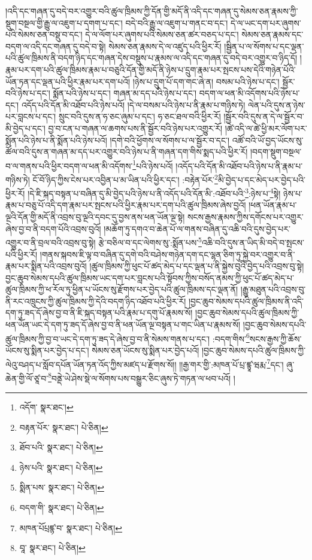 །འདི་དང་གཞན་དུ་བདེ་བར་འགྱུར་བའི་ཚུལ་ཁྲིམས་ཀྱི་དོན་གྱི་མདོ་ནི་འདི་དང་གཞན་དུ་སེམས་ཅན་རྣམས་ཀྱི་སྡུག་བསྔལ་གྱི་རྒྱུ་ལ་འཇུག་པ་དགག་པ་དང་། བདེ་བའི་རྒྱུ་ལ་འཇུག་པ་གནང་བ་དང་། དེ་ལ་ཡང་དག་པར་ཞུགས་པའི་སེམས་ཅན་བསྡུ་བ་དང་། དེ་ལ་ལོག་པར་ཞུགས་པའི་སེམས་ཅན་ཚར་བཅད་པ་དང་། སེམས་ཅན་རྣམས་དང་བདག་ལ་འདི་དང་གཞན་དུ་བདེ་བ་སྟེ། སེམས་ཅན་རྣམས་དེ་ལ་འཛུད་པའི་ཕྱིར་རོ། །སྦྱིན་པ་ལ་སོགས་པ་དང་ལྡན་པའི་ཚུལ་ཁྲིམས་ནི་བདག་ཉིད་དང་གཞན་དེས་བསྡུས་པ་རྣམས་ལ་འདི་དང་གཞན་དུ་བདེ་བར་འགྱུར་བ་ཉིད་དོ། །རྣམ་པར་དག་པའི་ཚུལ་ཁྲིམས་རྣམ་པ་བཅུའི་དོན་གྱི་མདོ་ནི་ཉེས་པ་དྲུག་རྣམ་པར་སྤངས་པས་དེའི་གཉེན་པོའི་ཡོན་ཏན་དང་ལྡན་པའི་ཕྱིར་རྣམ་པར་དག་པའོ། །ཉེས་པ་དྲུག་པོ་དག་གང་ཞེ་ན། བསམ་པའི་ཉེས་པ་དང་། སྦྱོར་བའི་ཉེས་པ་དང་། སྨོན་པའི་ཉེས་པ་དང་། གཞན་མ་དད་པའི་ཉེས་པ་དང་། བདག་ལ་ཕན་མི་འདོགས་པའི་ཉེས་པ་དང་། འདོད་པའི་དོན་མི་འཐོབ་པའི་ཉེས་པའོ། །དེ་ལ་བསམ་པའི་ཉེས་པ་ནི་རྣམ་པ་གཉིས་ཏེ། ལེན་པའི་དུས་ན་ཉེས་པར་བླངས་པ་དང་། སྲུང་བའི་དུས་ན་ཧ་ཅང་ཞུམ་པ་དང་། ཧ་ཅང་ཐལ་བའི་ཕྱིར་རོ། །སྦྱོར་བའི་དུས་ན་དེ་ལ་སྦྱོར་བ་མི་བྱེད་པ་དང་། བྱ་བ་ངན་པ་གཞན་ལ་ཆགས་པས་ནི་སྦྱོར་བའི་ཉེས་པར་འགྱུར་རོ། །ཚེ་འདི་ལ་ཚེ་ཕྱི་མར་ལོག་པར་སྨོན་པའི་ཉེས་པ་ནི་སྨོན་པའི་ཉེས་པའོ། །དགེ་བའི་ཕྱོགས་ལ་སོགས་པ་ལ་སྦྱོར་བ་དང་། འཚོ་བའི་ཡོ་བྱད་ཡོངས་སུ་ཚོལ་བའི་དུས་ན་གཞན་མ་དད་པར་འགྱུར་བའི་ཉེས་པ་ནི་གཞན་དག་གིས་སྨད་པའི་ཕྱིར་རོ། །བདག་སྡུག་བསྔལ་བ་ལ་གནས་པའི་ཕྱིར་བདག་ལ་ཕན་མི་འདོགས་\footnote{འདོག་  སྣར་ཐང་། }པའི་ཉེས་པའོ། །འདོད་པའི་དོན་མི་འཐོབ་པའི་ཉེས་པ་ནི་རྣམ་པ་གཉིས་ཏེ། ངོ་བོ་ཉིད་ཀྱིས་ངེས་པར་འབྱིན་པ་མ་ཡིན་པའི་ཕྱིར་དང་། :བརྟེན་པོར་\footnote{བརྟན་པོར་  སྣར་ཐང་།  པེ་ཅིན། }མི་བྱེད་པ་དང་མེད་པར་བྱེད་པའི་ཕྱིར་རོ། །དེ་ཇི་སྐད་བསྟན་པ་བཞིན་དུ་མི་བྱེད་པའི་ཉེས་པ་ནི་འདོད་པའི་དོན་མི་:འཐོབ་པའི་\footnote{ཐོབ་པའི་  སྣར་ཐང་།  པེ་ཅིན། }:ཉེས་པ་\footnote{ཉེས་པའི་  སྣར་ཐང་།  པེ་ཅིན། }སྟེ། ཉེས་པ་རྣམ་པ་བཅུ་པོ་འདི་དག་རྣམ་པར་སྤངས་པའི་ཕྱིར་རྣམ་པར་དག་པའི་ཚུལ་ཁྲིམས་ཞེས་བྱའོ། །ཕན་ཡོན་རྣམ་པ་ལྔའི་དོན་གྱི་མདོ་ནི་འབྲས་བུ་ལྔའི་དབང་དུ་བྱས་ནས་ཕན་ཡོན་ལྔ་སྟེ། སངས་རྒྱས་རྣམས་ཀྱིས་དགོངས་པར་འགྱུར་ཞེས་བྱ་བ་ནི་བདག་པོའི་འབྲས་བུའོ། །མཆོག་ཏུ་དགའ་བ་ཆེན་པོ་ལ་གནས་བཞིན་དུ་འཆི་བའི་དུས་བྱེད་པར་འགྱུར་བ་ནི་བྲལ་བའི་འབྲས་བུ་སྟེ། རྩེ་བཅིལ་བ་དང་ལེགས་སུ་:སྨོན་པས་\footnote{སྨིན་པས་  སྣར་ཐང་།  པེ་ཅིན། }འཆི་བའི་དུས་ན་ཡིད་མི་བདེ་བ་སྤངས་པའི་ཕྱིར་རོ། །གནས་སྐབས་ཇི་ལྟ་བ་བཞིན་དུ་དགེ་བའི་བཤེས་གཉེན་དག་དང་ལྷན་ཅིག་ཏུ་སྐྱེ་བར་འགྱུར་བ་ནི་རྣམ་པར་སྨིན་པའི་འབྲས་བུའོ། །ཚུལ་ཁྲིམས་ཀྱི་ཕུང་པོ་ཚད་མེད་པ་དང་ལྡན་པ་ནི་སྐྱེས་བུའི་བྱེད་པའི་འབྲས་བུ་སྟེ། བྱང་ཆུབ་སེམས་དཔའི་ཚུལ་ཁྲིམས་ཡང་དག་པར་བླངས་པའི་སྟོབས་ཀྱིས་བསོད་ནམས་ཀྱི་ཕུང་པོ་ཚད་མེད་པ་ཚུལ་ཁྲིམས་ཀྱི་ཕ་རོལ་ཏུ་ཕྱིན་པ་ཡོངས་སུ་རྫོགས་པར་བྱེད་པའི་ཚུལ་ཁྲིམས་དང་ལྡན་ནོ། །རྒྱུ་མཐུན་པའི་འབྲས་བུ་ནི་རང་འཁྲུངས་ཀྱི་ཚུལ་ཁྲིམས་ཀྱི་དེའི་བདག་ཉིད་འཐོབ་པའི་ཕྱིར་རོ། །བྱང་ཆུབ་སེམས་དཔའི་ཚུལ་ཁྲིམས་ནི་འདི་དག་ཏུ་ཟད་དོ་ཞེས་བྱ་བ་ནི་ཇི་སྐད་བསྟན་པའི་རྣམ་པ་དགུ་པོ་རྣམས་སོ། །བྱང་ཆུབ་སེམས་དཔའི་ཚུལ་ཁྲིམས་ཀྱི་ཕན་ཡོན་ཡང་དེ་དག་ཏུ་ཟད་དོ་ཞེས་བྱ་བ་ནི་ཕན་ཡོན་ལྔ་བསྟན་པ་གང་ཡིན་པ་རྣམས་སོ། །བྱང་ཆུབ་སེམས་དཔའི་ཚུལ་ཁྲིམས་ཀྱི་བྱ་བ་ཡང་དེ་དག་ཏུ་ཟད་དེ་ཞེས་བྱ་བ་ནི་སེམས་གནས་པ་དང་། :བདག་གིས་\footnote{བདག་གི་  སྣར་ཐང་།  པེ་ཅིན། }སངས་རྒྱས་ཀྱི་ཆོས་ཡོངས་སུ་སྨིན་པར་བྱེད་པ་དང་། སེམས་ཅན་ཡོངས་སུ་སྨིན་པར་བྱེད་པའོ། །བྱང་ཆུབ་སེམས་དཔའི་ཚུལ་ཁྲིམས་ཀྱི་ལེའུ་བཤད་པ་སློབ་དཔོན་ཡོན་ཏན་འོད་ཀྱིས་མཛད་པ་རྫོགས་སོ།། །།རྒྱ་གར་གྱི་:མཁན་པོ་པྲ་ཛྙཱ་ཝརྨ་\footnote{མཁན་པོཔྲཛྙ་བ་  སྣར་ཐང་།  པེ་ཅིན། }དང་། ཞུ་ཆེན་གྱི་ལོ་ཙཱ་བ་\footnote{བཱ་  སྣར་ཐང་།  པེ་ཅིན། }བནྡེ་ཡེ་ཤེས་སྡེ་ལ་སོགས་པས་བསྒྱུར་ཅིང་ཞུས་ཏེ་གཏན་ལ་ཕབ་པའོ། ། 